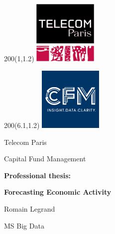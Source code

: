 \begin{titlepage}
	
	\begin{textblock}{200}(1,1.2)
		{\includegraphics[width=1.2in, height=1.2in]{images/logotelecom.png}}
	\end{textblock}
		
	\begin{textblock}{200}(6.1,1.2)
		{\includegraphics[width=1.2in, height=1.2in]{images/logocfm.png}}
	\end{textblock}

	\vspace*{45mm}
	
	\begin{center}
		
		{\fontsize{18}{26}\selectfont Telecom Paris} \vspace{5mm}
		
		{\fontsize{18}{26}\selectfont Capital Fund Management} \vspace{10mm}

		\begin{titlepagebox}
			
			\begin{center}
				\textbf{{\fontsize{24}{26}\selectfont Professional thesis:}}
				
				\textbf{{\fontsize{24}{26}\selectfont Forecasting Economic Activity}}	
			\end{center}
				
		\end{titlepagebox} \vspace{10mm}
	
	
		{\fontsize{18}{26}\selectfont Romain Legrand} \vspace{2mm}
		
		{\fontsize{18}{26}\selectfont MS Big Data} \vspace{2mm}
		

\end{center}
\end{titlepage}

